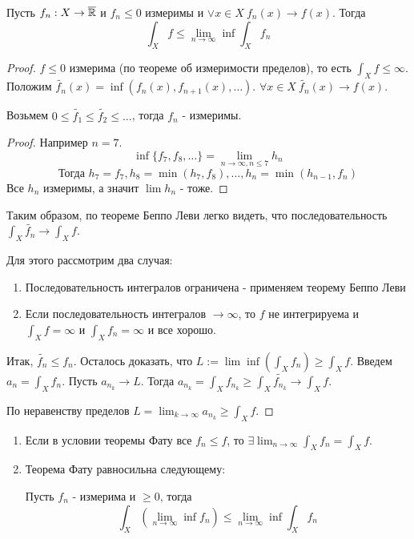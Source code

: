 \begin{theorem*}
    Пусть $f_n:X \to \overline{\mathbb{R}}$ и $f_n \le 0$ измеримы и $\vee x \in X \ f_n(x) \to f(x)$. Тогда 
    \[\int_X f \le \lim_{n \to \infty} \inf \int_X f_n\]

    \begin{proof}
        $f \le 0$ измерима (по теореме об измеримости пределов), то есть $\int_X f \le \infty$. Положим $\tilde{f_n}(x) = \inf(f_n(x), f_{n+1}(x), \hdots)$. $\forall x \in X \ \tilde{f_n}(x) \to f(x)$.
        
        \begin{lemma*}
            Возьмем $0 \le \tilde{f_1} \le \tilde{f_2} \le \hdots$, тогда $f_n$ - измеримы.
            \begin{proof}
                Например $n = 7$.
                \[\inf\{f_7, f_8, \hdots\} = \lim_{n \to \infty, n \le 7} h_n\]
                \[\text{Тогда } h_7 = f_7, h_8 = \min(h_7, f_8), \hdots, h_n = \min(h_{n-1}, f_n)\]
                Все $h_n$ измеримы, а значит $\lim h_n$ - тоже.
            \end{proof}
        \end{lemma*}
        Таким образом, по теореме Беппо Леви легко видеть, что последовательность $\int_X \tilde{f_n} \to \int_X f$.
        \par
        Для этого рассмотрим два случая:
        \begin{enumerate}
            \item Последовательность интегралов ограничена - применяем теорему Беппо Леви
            \item Если последовательность интегралов $\to \infty$, то $f$ не интегрируема и $\int_X f = \infty$ и $\int_X f_n = \infty$ и все хорошо.
        \end{enumerate}

        \par
        Итак, $\tilde{f_n} \le f_n$. Осталось доказать, что $L:= \lim \inf(\int_X f_n) \ge \int_X f$. Введем $a_n = \int_X f_n$. Пусть $a_{n_k} \to L$. Тогда $a_{n_k} = \int_X f_{n_k} \ge \int_X \tilde{f_{n_k}} \to \int_X f$.
        \par
        По неравенству пределов $L = \lim_{k \to \infty} a_{n_k} \ge \int_X f$.
    \end{proof}
\end{theorem*}

\begin{statement*}
    \begin{enumerate}
        \item Если в условии теоремы Фату все $f_n \le f$, то $\exists \lim_{n \to \infty} \int_X f_n = \int_X f$.
        \item Теорема Фату равносильна следующему:
        \par
        Пусть $f_n$ - измерима и $\ge 0$, тогда 
        \[\int_X \left( \lim_{n \to \infty} \inf f_n \right) \le \lim_{n \to \infty} \inf \int_X f_n\]
    \end{enumerate}
\end{statement*}
